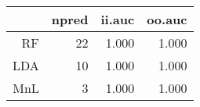 \begin{table}[ht]
\centering
\begin{tabular}{rrrr}
  \hline
 & npred & ii.auc & oo.auc \\ 
  \hline
RF &   22 & 1.000 & 1.000 \\ 
  LDA &   10 & 1.000 & 1.000 \\ 
  MnL &    3 & 1.000 & 1.000 \\ 
   \hline
\end{tabular}
\label{tab:second_res}
\end{table}

